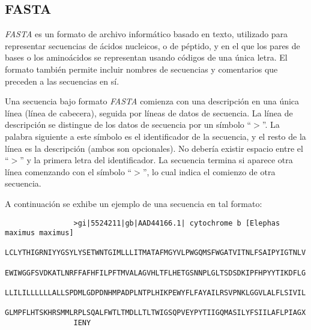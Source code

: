 \documentclass[12pt,a4paper,spanish]{article}
\begin{document}
	\subsection{FASTA}
		\par \textit{FASTA} \cite{1} es un formato de archivo informático basado en texto, utilizado para representar 			secuencias de ácidos nucleicos, o de péptido, y en el que los pares de bases o los aminoácidos se representan 			usando códigos de una única letra. El formato también permite incluir nombres de secuencias y comentarios que 			preceden a las secuencias en sí.	

		\par Una secuencia bajo formato \textit{FASTA} comienza con una descripción en una única línea (línea de 			cabecera), seguida por líneas de datos de secuencia. La línea de descripción se distingue de los datos de 			secuencia por un símbolo ``$>$''. La palabra siguiente a este símbolo es el identificador de la secuencia, y el 		resto de la línea es la descripción (ambos son opcionales). No debería existir espacio entre el ``$>$'' y la 			primera letra del identificador. La secuencia termina si aparece otra línea comenzando con el símbolo ``$>$'', lo 			cual indica el comienzo de otra secuencia. 
		\par A continuación se exhibe un ejemplo de una secuencia en tal formato:	
		\begin{verbatim}
				>gi|5524211|gb|AAD44166.1| cytochrome b [Elephas maximus maximus]
				LCLYTHIGRNIYYGSYLYSETWNTGIMLLLITMATAFMGYVLPWGQMSFWGATVITNLFSAIPYIGTNLV
				EWIWGGFSVDKATLNRFFAFHFILPFTMVALAGVHLTFLHETGSNNPLGLTSDSDKIPFHPYYTIKDFLG
				LLILILLLLLLALLSPDMLGDPDNHMPADPLNTPLHIKPEWYFLFAYAILRSVPNKLGGVLALFLSIVIL
				GLMPFLHTSKHRSMMLRPLSQALFWTLTMDLLTLTWIGSQPVEYPYTIIGQMASILYFSIILAFLPIAGX
				IENY
		\end{verbatim}
\end{document}
